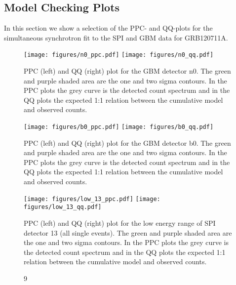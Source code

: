 \documentclass[twocolumn]{aa}
\begin{document}
\begin{appendix}
  \section{Model Checking Plots}
  \label{appendix1}
  In this section we show a selection of the PPC- and QQ-plots for the simultaneous synchrotron fit to the SPI and GBM data for GRB120711A.
  \begin{figure}[h]
    \begin{centering}
      \texttt{[image: figures/n0\_ppc.pdf]}
      \texttt{[image: figures/n0\_qq.pdf]}
      \caption{PPC (left) and QQ (right) plot for the GBM detector n0. The green and purple shaded area are the one and two sigma contours. In the PPC plots the grey curve is the detected count spectrum and in the QQ plots the expected 1:1 relation between the cumulative model and observed counts.}
      \label{fig:n0_model_check}
    \end{centering}
  \end{figure}
  \begin{figure}[h]
    \begin{centering}
      \texttt{[image: figures/b0\_ppc.pdf]}
      \texttt{[image: figures/b0\_qq.pdf]}
      \caption{PPC (left) and QQ (right) plot for the GBM detector b0. The green and purple shaded area are the one and two sigma contours. In the PPC plots the grey curve is the detected count spectrum and in the QQ plots the expected 1:1 relation between the cumulative model and observed counts.}
      \label{fig:b0_model_check}
    \end{centering}
  \end{figure}
  \begin{figure}[h]
    \begin{centering}
      \texttt{[image: figures/low\_13\_ppc.pdf]}
      \texttt{[image: figures/low\_13\_qq.pdf]}
      \caption{PPC (left) and QQ (right) plot for the low energy range of SPI detector 13 (all single events). The green and purple shaded area are the one and two sigma contours. In the PPC plots the grey curve is the detected count spectrum and in the QQ plots the expected 1:1 relation between the cumulative model and observed counts.}
      \label{fig:low_13_model_check}
    \end{centering}
  \end{figure}
  \begin{figure}[h]9

\end{figure}
\end{appendix}
\end{document}
